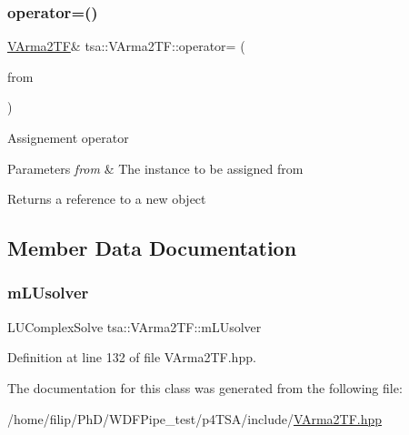 \subsubsection{\texorpdfstring{operator=()}{operator=()}}
{\footnotesize\ttfamily \hyperlink{classtsa_1_1_v_arma2_t_f}{V\+Arma2\+TF}\& tsa\+::\+V\+Arma2\+T\+F\+::operator= (\begin{DoxyParamCaption}\item[{const \hyperlink{classtsa_1_1_v_arma2_t_f}{V\+Arma2\+TF} \&}]{from }\end{DoxyParamCaption})}

Assignement operator


\begin{DoxyParams}{Parameters}
{\em from} & The instance to be assigned from\\
\hline
\end{DoxyParams}
\begin{DoxyReturn}{Returns}
a reference to a new object 
\end{DoxyReturn}


\subsection{Member Data Documentation}
\mbox{\label{classtsa_1_1_v_arma2_t_f_a140ef6079dc2bc152a9a8b220c278fd8}} 
\subsubsection{\texorpdfstring{m\+L\+Usolver}{mLUsolver}}
{\footnotesize\ttfamily L\+U\+Complex\+Solve tsa\+::\+V\+Arma2\+T\+F\+::m\+L\+Usolver\hspace{0.3cm}{\ttfamily [private]}}



Definition at line 132 of file V\+Arma2\+T\+F.\+hpp.



The documentation for this class was generated from the following file\+:\begin{DoxyCompactItemize}
\item 
/home/filip/\+Ph\+D/\+W\+D\+F\+Pipe\+\_\+test/p4\+T\+S\+A/include/\hyperlink{_v_arma2_t_f_8hpp}{V\+Arma2\+T\+F.\+hpp}\end{DoxyCompactItemize}
